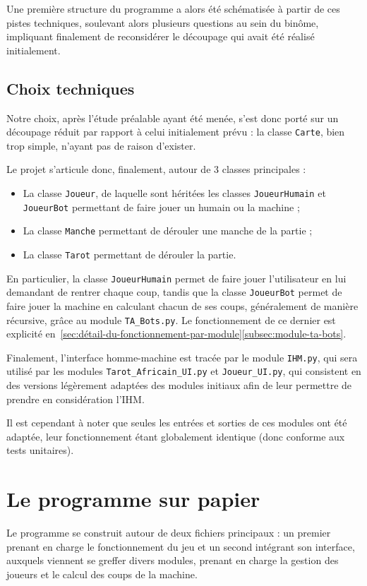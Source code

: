       Une première structure du programme a alors été schématisée à partir de ces pistes techniques, soulevant alors plusieurs questions au sein du binôme, impliquant finalement de reconsidérer le découpage qui avait été réalisé initialement.

   \subsection{Choix techniques}\label{subsec:choix-techniques}
      Notre choix, après l'étude préalable ayant été menée, s'est donc porté sur un découpage réduit par rapport à celui initialement prévu : la classe \texttt{Carte}, bien trop simple, n'ayant pas de raison d'exister.

      Le projet s'articule donc, finalement, autour de 3 classes principales :
      \begin{itemize}
         \item La classe \texttt{Joueur}, de laquelle sont héritées les classes \texttt{JoueurHumain} et \texttt{JoueurBot} permettant de faire jouer un humain ou la machine ;
         \item La classe \texttt{Manche} permettant de dérouler une manche de la partie ;
         \item La classe \texttt{Tarot} permettant de dérouler la partie.
      \end{itemize}

      En particulier, la classe \texttt{JoueurHumain} permet de faire jouer l'utilisateur en lui demandant de rentrer chaque coup, tandis que la classe \texttt{JoueurBot} permet de faire jouer la machine en calculant chacun de ses coups, généralement de manière récursive, grâce au module \texttt{TA\_Bots.py}.
      Le fonctionnement de ce dernier est explicité en~\ref{sec:détail-du-fonctionnement-par-module}\ref{subsec:module-ta-bots}.

      Finalement, l'interface homme-machine est tracée par le module \texttt{IHM.py}, qui sera utilisé par les modules \texttt{Tarot\_Africain\_UI.py} et \texttt{Joueur\_UI.py}, qui consistent en des versions légèrement adaptées des modules initiaux afin de leur permettre de prendre en considération l'IHM\@.

      Il est cependant à noter que seules les entrées et sorties de ces modules ont été adaptée, leur fonctionnement étant globalement identique (donc conforme aux tests unitaires).


\section{Le programme sur papier}\label{sec:le-programme-sur-papier}
   Le programme se construit autour de deux fichiers principaux : un premier prenant en charge le fonctionnement du jeu et un second intégrant son interface, auxquels viennent se greffer divers modules, prenant en charge la gestion des joueurs et le calcul des coups de la machine.

